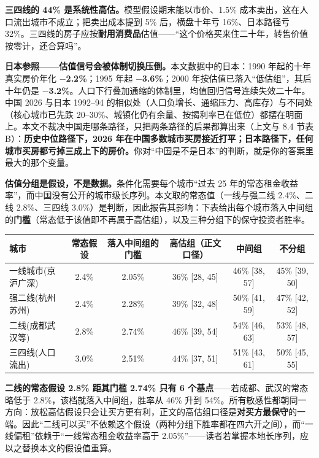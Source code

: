 \documentclass[11pt,a4paper]{ctexart}
\begin{document}
\textbf{三四线的 44\% 是系统性高估。}模型假设期末能以市价、1.5\% 成本卖出，这在人口流出城市不成立；把卖出成本提到 5\% 后，横盘十年亏 16\%、日本路径亏 32\%。三四线的房子应按\textbf{耐用消费品}估值——``这个价格买来住二十年，转售价值按零计，还合算吗''。

\textbf{日本参照——估值信号会被体制切换压倒。}本文数据中的日本：1990 年起的十年真实房价年化 \textbf{$-$2.2\%}；1995 年起 \textbf{$-$3.6\%}；2000 年按估值已落入``低估组''，其后十年仍是 \textbf{$-$3.2\%}。人口下行叠加通缩的体制里，均值回归信号连续失效二十年。中国 2026 与日本 1992--94 的相似处（人口负增长、通缩压力、高库存）与不同处（核心城市已先跌 20--30\%、城镇化仍有余量、按揭利率已在低位）都摆在明面上。本文不裁决中国走哪条路径，只把两条路径的后果都算出来（上文与 8.4 节表 B）：\textbf{历史中位路径下，2026 年在中国多数城市买房接近打平；日本路径下，任何城市买房都亏掉三成上下的房价。}你对``中国是不是日本''的判断，就是你的答案里最大的那个变量。

\textbf{估值分组是假设，不是数据。}条件化需要每个城市``过去 25 年的常态租金收益率''，而中国没有公开的城市级长序列。本文取的常态值（一线与强二线 2.4\%、二线 2.8\%、三四线 3.0\%）是判断，因此报告其影响：下表给出每个城市落入中间组的\textbf{门槛}（常态低于该值即不再属于高估组），以及三种分组下的保守投资者胜率。

\begin{table}[H]\centering\footnotesize
\begin{tabular}{lccccc}
\toprule
城市 & 常态假设 & 落入中间组的门槛 & 高估组（正文口径） & 中间组 & 不分组 \\
\midrule
一线城市(京沪广深) & 2.4\% & 2.05\% & 36\% [28, 45] & 46\% [38, 57] & 45\% [39, 50] \\
强二线(杭州苏州) & 2.4\% & 2.28\% & 39\% [32, 48] & 50\% [41, 59] & 47\% [42, 52] \\
二线(成都武汉等) & 2.8\% & 2.74\% & 46\% [39, 54] & 54\% [46, 63] & 53\% [48, 57] \\
三四线(人口流出) & 3.0\% & 2.51\% & 44\% [37, 51] & 51\% [43, 61] & 50\% [45, 55] \\
\bottomrule
\end{tabular}
\end{table}

\textbf{二线的常态假设 2.8\% 距其门槛 2.74\% 只有 6 个基点}——若成都、武汉的常态略低于 2.8\%，该档就落入中间组，胜率从 46\% 升到 54\%。所有敏感性都朝同一方向：放松高估假设只会让买方更有利，正文的高估组口径是\textbf{对买方最保守}的一端。因此``二线可以买''不依赖这个假设（两种分组下胜率都在四六开之间），而``一线偏租''依赖于``一线常态租金收益率高于 2.05\%''——读者若掌握本地长序列，应以之替换本文的假设值重算。
\end{document}
